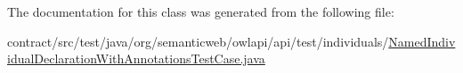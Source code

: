 The documentation for this class was generated from the following file\-:\begin{DoxyCompactItemize}
\item 
contract/src/test/java/org/semanticweb/owlapi/api/test/individuals/\hyperlink{_named_individual_declaration_with_annotations_test_case_8java}{Named\-Individual\-Declaration\-With\-Annotations\-Test\-Case.\-java}\end{DoxyCompactItemize}
